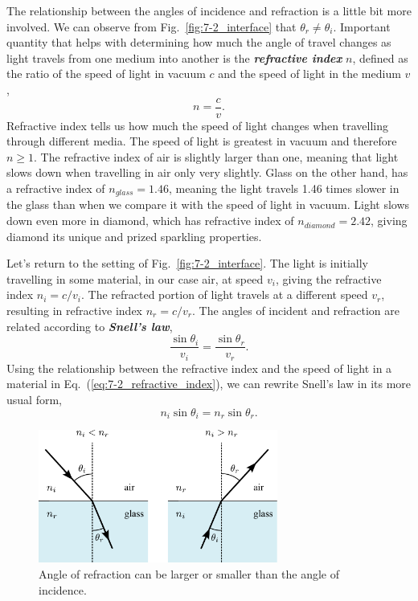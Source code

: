 The relationship between the angles of incidence and refraction is a little bit more involved.
We can observe from Fig.~\ref{fig:7-2_interface} that $\theta_r \neq \theta_i$.
Important quantity that helps with determining how much the angle of travel changes as light travels from one medium into another is the \textit{\textbf{refractive index}} $n$, defined as the ratio of the speed of light in vacuum $c$ and the speed of light in the medium $v$,
\begin{equation}
    n = \frac{c}{v}.
    \label{eq:7-2_refractive_index}
\end{equation}
Refractive index tells us how much the speed of light changes when travelling through different media.
The speed of light is greatest in vacuum and therefore $n\geq1$.
The refractive index of air is slightly larger than one, meaning that light slows down when travelling in air only very slightly.
Glass on the other hand, has a refractive index of $n_{glass} = 1.46$, meaning the light travels 1.46 times slower in the glass than when we compare it with the speed of light in vacuum.
Light slows down even more in diamond, which has refractive index of $n_{diamond} = 2.42$, giving diamond its unique and prized sparkling properties.

Let's return to the setting of Fig.~\ref{fig:7-2_interface}.
The light is initially travelling in some material, in our case air, at speed $v_i$, giving the refractive index $n_i = c / v_i$.
The refracted portion of light travels at a different speed $v_r$, resulting in refractive index $n_r = c / v_r$.
The angles of incident and refraction are related according to \textit{\textbf{Snell's law}},
\begin{equation}
    \frac{\sin\theta_i}{v_i} = \frac{\sin\theta_r}{v_r}.
\end{equation}
Using the relationship between the refractive index and the speed of light in a material in Eq.~(\ref{eq:7-2_refractive_index}), we can rewrite Snell's law in its more usual form,
\begin{equation}
    n_i \sin \theta_i = n_r \sin \theta_r.
    \label{eq:7-2_snell}
\end{equation}

\begin{figure}
    \centering
    \includegraphics[width=0.7\textwidth]{lesson7/7-2_snell.pdf}
    \caption[Snell's law]{Angle of refraction can be larger or smaller than the angle of incidence.}
    \label{fig:7-2_snell_law}
\end{figure}

